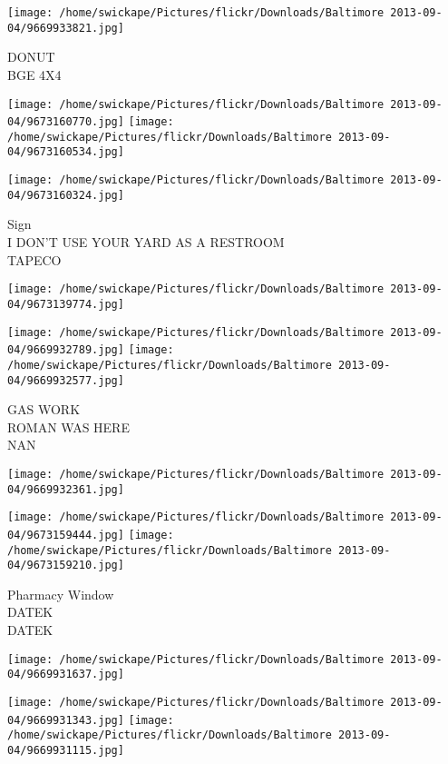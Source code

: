 \documentclass[10pt,letterpaper]{article}
\begin{document}
\vspace{0.25in}
\texttt{[image: /home/swickape/Pictures/flickr/Downloads/Baltimore 2013-09-04/9669933821.jpg]}

DONUT\\
BGE 4X4
\pagebreak

\texttt{[image: /home/swickape/Pictures/flickr/Downloads/Baltimore 2013-09-04/9673160770.jpg]}
\texttt{[image: /home/swickape/Pictures/flickr/Downloads/Baltimore 2013-09-04/9673160534.jpg]}

\vspace{0.25in}
\texttt{[image: /home/swickape/Pictures/flickr/Downloads/Baltimore 2013-09-04/9673160324.jpg]}

Sign\\
I DON'T USE YOUR YARD AS A RESTROOM\\
TAPECO
\pagebreak

\texttt{[image: /home/swickape/Pictures/flickr/Downloads/Baltimore 2013-09-04/9673139774.jpg]}

\vspace{0.25in}
\texttt{[image: /home/swickape/Pictures/flickr/Downloads/Baltimore 2013-09-04/9669932789.jpg]}
\texttt{[image: /home/swickape/Pictures/flickr/Downloads/Baltimore 2013-09-04/9669932577.jpg]}

GAS WORK\\
ROMAN WAS HERE\\
NAN
\pagebreak

\texttt{[image: /home/swickape/Pictures/flickr/Downloads/Baltimore 2013-09-04/9669932361.jpg]}

\vspace{0.25in}
\texttt{[image: /home/swickape/Pictures/flickr/Downloads/Baltimore 2013-09-04/9673159444.jpg]}
\texttt{[image: /home/swickape/Pictures/flickr/Downloads/Baltimore 2013-09-04/9673159210.jpg]}

Pharmacy Window\\
DATEK\\
DATEK
\pagebreak

\texttt{[image: /home/swickape/Pictures/flickr/Downloads/Baltimore 2013-09-04/9669931637.jpg]}

\vspace{0.25in}
\texttt{[image: /home/swickape/Pictures/flickr/Downloads/Baltimore 2013-09-04/9669931343.jpg]}
\texttt{[image: /home/swickape/Pictures/flickr/Downloads/Baltimore 2013-09-04/9669931115.jpg]}
\end{document}
